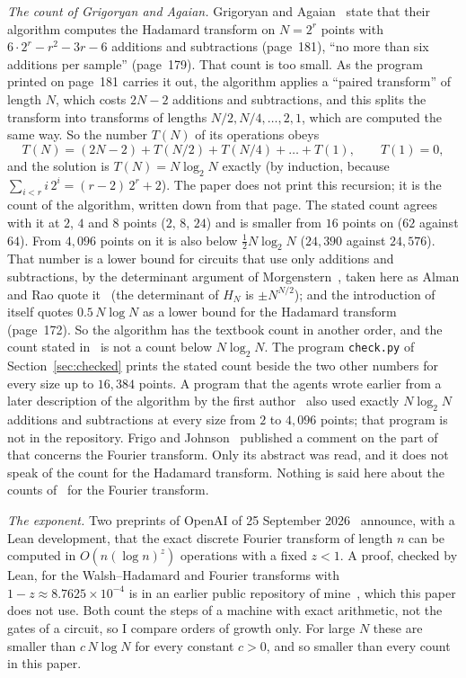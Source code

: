 \documentclass[10pt]{article}
\theoremstyle{remark}
\renewcommand{\lg}{\log_2}
\begin{document}
\emph{The count of Grigoryan and Agaian.}
Grigoryan and Agaian~\cite{GA} state that their algorithm computes the Hadamard transform on $N=2^r$ points
with $6\cdot2^r-r^2-3r-6$ additions and subtractions (page~181), ``no more than six additions per sample''
(page~179). That count is too small. As the program printed on page~181 carries it out, the algorithm
applies a ``paired transform'' of length $N$, which costs $2N-2$ additions and subtractions, and this splits
the transform into transforms of lengths $N/2,N/4,\dots,2,1$, which are computed the same way. So the number
$T(N)$ of its operations obeys
\[
T(N)=(2N-2)+T(N/2)+T(N/4)+\dots+T(1),\qquad T(1)=0 ,
\]
and the solution is $T(N)=N\lg N$ exactly (by induction, because $\sum_{i<r}i\,2^i=(r-2)\,2^r+2$). The paper
does not print this recursion; it is the count of the algorithm, written down from that page. The stated
count agrees with it at $2$, $4$ and $8$ points ($2$, $8$, $24$) and is smaller from $16$ points on ($62$
against $64$). From $4{,}096$ points on it is also below $\tfrac12N\lg N$ ($24{,}390$ against $24{,}576$).
That number is a lower bound for circuits that use only additions and subtractions, by the determinant
argument of Morgenstern~\cite{Morgenstern}, taken here as Alman and Rao quote it~\cite{AR} (the
determinant of $H_N$ is $\pm N^{N/2}$); and the introduction of~\cite{GA} itself quotes $0.5\,N\log N$ as a
lower bound for the Hadamard transform (page~172). So the algorithm has the textbook count in another order,
and the count stated in~\cite{GA} is not a count below $N\lg N$. The program \verb|check.py| of
Section~\ref{sec:checked} prints the stated count beside the two other numbers for every size up to
$16{,}384$ points. A program that the agents wrote earlier from a later description of the algorithm by the
first author~\cite{GB} also used exactly $N\lg N$ additions and subtractions at every size from $2$ to
$4{,}096$ points; that program is not in the repository. Frigo and Johnson~\cite{FJ} published a comment on
the part of~\cite{GA} that concerns the Fourier transform. Only its abstract was read, and it does not speak
of the count for the Hadamard transform. Nothing is said here about the counts of~\cite{GA} for the
Fourier transform.

\emph{The exponent.} Two preprints of OpenAI of 25 September 2026~\cite{OAI1,OAI2} announce, with a Lean development, that the exact
discrete Fourier transform of length $n$ can be computed in $O(n(\log n)^{z})$ operations with a fixed $z<1$.
A proof, checked by Lean, for the Walsh--Hadamard and Fourier transforms with
$1-z\approx 8.7625\times 10^{-4}$ is in an earlier public repository of mine~\cite{RepoPS}, which this paper
does not use. Both count the steps of a machine
with exact arithmetic, not the gates of a circuit, so I compare orders of growth only. For large $N$ these are smaller
than $c\,N\log N$ for every constant $c>0$, and so smaller than every count in this paper.
\end{document}
